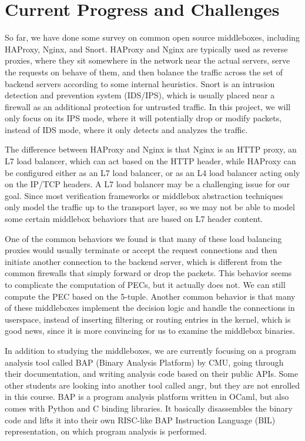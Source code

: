 \section{Current Progress and Challenges}

So far, we have done some survey on common open source middleboxes, including
HAProxy, Nginx, and Snort. HAProxy and Nginx are typically used as reverse
proxies, where they sit somewhere in the network near the actual servers, serve
the requests on behave of them, and then balance the traffic across the set of
backend servers according to some internal heuristics. Snort is an intrusion
detection and prevention system (IDS/IPS), which is usually placed near a
firewall as an additional protection for untrusted traffic. In this project, we
will only focus on its IPS mode, where it will potentially drop or modify
packets, instead of IDS mode, where it only detects and analyzes the traffic.

The difference between HAProxy and Nginx is that Nginx is an HTTP proxy, an L7
load balancer, which can act based on the HTTP header, while HAProxy can be
configured either as an L7 load balancer, or as an L4 load balancer acting only
on the IP/TCP headers. A L7 load balancer may be a challenging issue for our
goal. Since most verification frameworks or middlebox abstraction techniques
only model the traffic up to the transport layer, so we may not be able to model
some certain middlebox behaviors that are based on L7 header content.

One of the common behaviors we found is that many of these load balancing
proxies would usually terminate or accept the request connections and then
initiate another connection to the backend server, which is different from
the common firewalls that simply forward or drop the packets. This behavior
seems to complicate the computation of PECs, but it actually does not. We can
still compute the PEC based on the 5-tuple. Another common behavior is that many
of these middleboxes implement the decision logic and handle the connections in
userspace, instead of inserting filtering or routing entries in the kernel,
which is good news, since it is more convincing for us to examine the middlebox
binaries.

In addition to studying the middleboxes, we are currently focusing on a program
analysis tool called BAP (Binary Analysis Platform) by CMU, going through their
documentation, and writing analysis code based on their public APIs. Some other
students are looking into another tool called angr, but they are not enrolled in
this course. BAP is a program analysis platform written in OCaml, but also comes
with Python and C binding libraries. It basically disassembles the binary code
and lifts it into their own RISC-like BAP Instruction Language (BIL)
representation, on which program analysis is performed.

